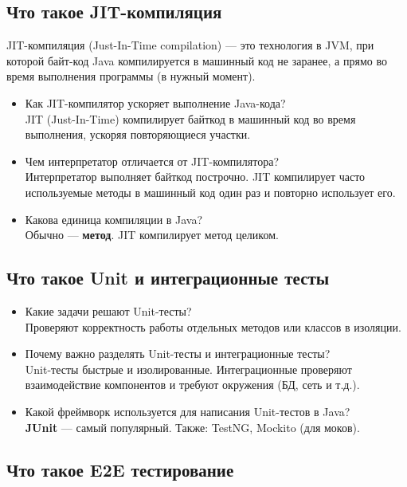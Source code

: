 \documentclass[a4paper,14pt]{article}
\begin{document}
\subsection{Что такое JIT-компиляция}
JIT-компиляция (Just-In-Time compilation) — это технология в JVM, при которой байт-код Java компилируется в машинный код не заранее, а прямо во время выполнения программы (в нужный момент).
\begin{itemize}
\item Как JIT-компилятор ускоряет выполнение Java-кода? \\
JIT (Just-In-Time) компилирует байткод в машинный код во время выполнения, ускоряя повторяющиеся участки.

\item Чем интерпретатор отличается от JIT-компилятора? \\
Интерпретатор выполняет байткод построчно. JIT компилирует часто используемые методы в машинный код один раз и повторно использует его.

\item Какова единица компиляции в Java? \\
Обычно — \textbf{метод}. JIT компилирует метод целиком.
\end{itemize}

\subsection{Что такое Unit и интеграционные тесты}

\begin{itemize}
\item Какие задачи решают Unit-тесты? \\
Проверяют корректность работы отдельных методов или классов в изоляции.

\item Почему важно разделять Unit-тесты и интеграционные тесты? \\
Unit-тесты быстрые и изолированные. Интеграционные проверяют взаимодействие компонентов и требуют окружения (БД, сеть и т.д.).

\item Какой фреймворк используется для написания Unit-тестов в Java? \\
\textbf{JUnit} — самый популярный. Также: TestNG, Mockito (для моков).
\end{itemize}

\subsection{Что такое E2E тестирование}
\end{document}
